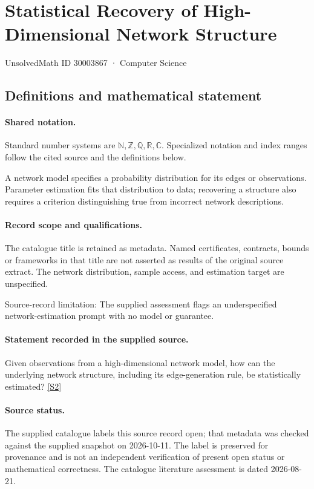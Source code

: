 \documentclass[11pt]{article}
\newcommand{\sref}[2]{\hyperlink{source:#1:#2}{[S#2]}}
\begin{document}
\setcounter{section}{30003866}
\section{Statistical Recovery of High-Dimensional Network Structure}\label{30003867}
{\small\sffamily UnsolvedMath ID 30003867 · Computer Science}
\subsection{Definitions and mathematical statement}

\paragraph{Shared notation.}Standard number systems are $\mathbb N,\mathbb Z,\mathbb Q,\mathbb R,\mathbb C$. Specialized notation and index ranges follow the cited source and the definitions below.


A network model specifies a probability distribution for its edges or observations. Parameter estimation fits that distribution to data; recovering a structure also requires a criterion distinguishing true from incorrect network descriptions.
\paragraph{Record scope and qualifications.}
The catalogue title is retained as metadata. Named certificates, contracts, bounds or frameworks in that title are not asserted as results of the original source extract.
The network distribution, sample access, and estimation target are unspecified.

Source-record limitation: The supplied assessment flags an underspecified network-estimation prompt with no model or guarantee.
\paragraph{Statement recorded in the supplied source.}
Given observations from a high-dimensional network model, how can the underlying network structure, including its edge-generation rule, be statistically estimated? \sref{30003867}{2}
\paragraph{Source status.}
The supplied catalogue labels this source record open; that metadata was checked against the supplied snapshot on 2026-10-11. The label is preserved for provenance and is not an independent verification of present open status or mathematical correctness. The catalogue literature assessment is dated 2026-08-21.
\end{document}
